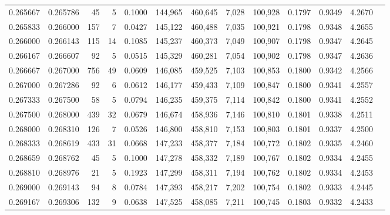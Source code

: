 \begin{tabular}{rrrrrrrrrrrrr}
0.265667 & 0.265786 &    45 &   5 &                                     0.1000 & 144,965 & 460,645 &   7,028 & 100,928 & 0.1797 & 0.9349 & 4.2670 \\
0.265833 & 0.266000 &   157 &   7 &                                     0.0427 & 145,122 & 460,488 &   7,035 & 100,921 & 0.1798 & 0.9348 & 4.2655 \\
0.266000 & 0.266143 &   115 &  14 &                                     0.1085 & 145,237 & 460,373 &   7,049 & 100,907 & 0.1798 & 0.9347 & 4.2645 \\
0.266167 & 0.266607 &    92 &   5 &                                     0.0515 & 145,329 & 460,281 &   7,054 & 100,902 & 0.1798 & 0.9347 & 4.2636 \\
0.266667 & 0.267000 &   756 &  49 &                                     0.0609 & 146,085 & 459,525 &   7,103 & 100,853 & 0.1800 & 0.9342 & 4.2566 \\
0.267000 & 0.267286 &    92 &   6 &                                     0.0612 & 146,177 & 459,433 &   7,109 & 100,847 & 0.1800 & 0.9341 & 4.2557 \\
0.267333 & 0.267500 &    58 &   5 &                                     0.0794 & 146,235 & 459,375 &   7,114 & 100,842 & 0.1800 & 0.9341 & 4.2552 \\
0.267500 & 0.268000 &   439 &  32 &                                     0.0679 & 146,674 & 458,936 &   7,146 & 100,810 & 0.1801 & 0.9338 & 4.2511 \\
0.268000 & 0.268310 &   126 &   7 &                                     0.0526 & 146,800 & 458,810 &   7,153 & 100,803 & 0.1801 & 0.9337 & 4.2500 \\
0.268333 & 0.268619 &   433 &  31 &                                     0.0668 & 147,233 & 458,377 &   7,184 & 100,772 & 0.1802 & 0.9335 & 4.2460 \\
0.268659 & 0.268762 &    45 &   5 &                                     0.1000 & 147,278 & 458,332 &   7,189 & 100,767 & 0.1802 & 0.9334 & 4.2455 \\
0.268810 & 0.268976 &    21 &   5 &                                     0.1923 & 147,299 & 458,311 &   7,194 & 100,762 & 0.1802 & 0.9334 & 4.2453 \\
0.269000 & 0.269143 &    94 &   8 &                                     0.0784 & 147,393 & 458,217 &   7,202 & 100,754 & 0.1802 & 0.9333 & 4.2445 \\
0.269167 & 0.269306 &   132 &   9 &                                     0.0638 & 147,525 & 458,085 &   7,211 & 100,745 & 0.1803 & 0.9332 & 4.2433 \\

\end{tabular}
